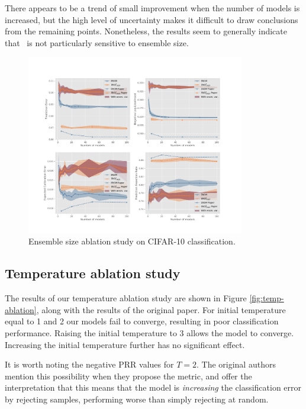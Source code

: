 There appears to be a trend of small improvement when the number of models is increased, but the high level of uncertainty makes it difficult to draw conclusions from the remaining points. Nonetheless, the results seem to generally indicate that \EnDD \ is not particularly sensitive to ensemble size. 

\begin{figure}[h!]
    \centering
    \includegraphics[trim = 70 54 100 100, clip, width = 0.85\textwidth]{../openreview/plots/Figure_8.png}
    \caption{Ensemble size ablation study on CIFAR-10 classification.}
    \label{fig:size-ablation}
\end{figure}

\subsection{Temperature ablation study}

The results of our temperature ablation study are shown in Figure \ref{fig:temp-ablation}, along with the results of the original paper. For initial temperature equal to 1 and 2 our models fail to converge, resulting in poor classification performance. Raising the initial temperature to 3 allows the model to converge. Increasing the initial temperature further has no significant effect. 

It is worth noting the negative PRR values for $T=2$. The original authors mention this possibility when they propose the metric, and offer the interpretation that this means that the model is \textit{increasing} the classification error by rejecting samples, performing worse than simply rejecting at random. 

